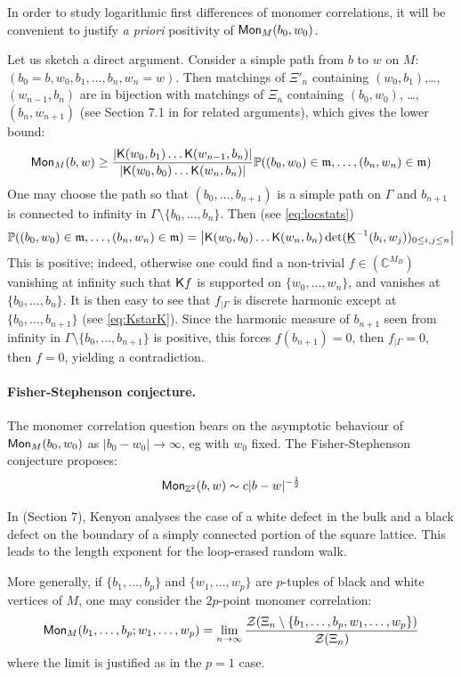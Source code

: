 \documentclass[10pt]{article}
\newcommand{\Z}{\mathbb{Z}}
\newcommand{\C}{\mathbb{C}}
\newcommand{\mc}{\mathcal}
\renewcommand{\P}{\mathbb{P}}
\newcommand{\rK}{{\sf K}}
\newcommand{\uK}{{\underline {\sf K}}}
\newcommand{\mfm}{{\mathfrak m}}
\newcommand{\Mon}{{\sf Mon}}
\begin{document}
In order to study logarithmic first differences of monomer correlations, it will be convenient to justify {\em a priori} positivity of $\Mon_M(b_0,w_0)$. 

Let us sketch a direct argument. Consider a simple path from $b$ to $w$ on $M$: $(b_0=b,w_0,b_1,\dots,b_n,w_{n}=w)$. Then matchings of $\Xi'_n$ containing $(w_0,b_1)$,\dots,$(w_{n-1},b_n)$ are in bijection with matchings of $\Xi_n$ containing $(b_0,w_0)$, \dots, $(b_n,w_{n+1})$ (see Section 7.1 in \cite{Ken_Lap} for related arguments), which gives the lower bound:
\begin{equation}\label{eq:monopos}
\Mon_M(b,w)\geq\frac{|\rK(w_0,b_1)\dots\rK(w_{n-1},b_n)|}{|\rK(w_0,b_0)\dots\rK(w_{n},b_n)|}\P((b_0,w_0)\in\mfm,\dots,(b_n,w_{n})\in\mfm)
\end{equation}
One may choose the path so that $(b_0,\dots,b_{n+1})$ is a simple path on $\Gamma$ and $b_{n+1}$ is connected to infinity in $\Gamma\setminus\{b_0,\dots,b_{n}\}$. Then (see \eqref{eq:locstats})
$$\P((b_0,w_0)\in\mfm,\dots,(b_n,w_{n})\in\mfm)=\left|\rK(w_0,b_0)\dots\rK(w_{n},b_n)\det(\uK^{-1}(b_{i},w_j))_{0\leq i,j\leq n}\right|$$
This is positive; indeed, otherwise one could find a non-trivial $f\in (\C^{M_B})$ vanishing at infinity such that $\rK f$ is supported on $\{w_0,\dots,w_n\}$, and vanishes at $\{b_0,\dots,b_n\}$. It is then easy to see that $f_{|\Gamma}$ is discrete harmonic except at $\{b_0,\dots,b_{n+1}\}$ (see \eqref{eq:KstarK}). Since the harmonic measure of $b_{n+1}$ seen from infinity in $\Gamma\setminus\{b_0,\dots,b_{n+1}\}$ is positive, this forces $f(b_{n+1})=0$, then $f_{|\Gamma}=0$, then $f=0$, yielding a contradiction.

\paragraph{Fisher-Stephenson conjecture.\\}

The monomer correlation question bears on the asymptotic behaviour of $\Mon_M(b_0,w_0)$ as $|b_0-w_0|\rightarrow\infty$, eg with $w_0$ fixed. The Fisher-Stephenson conjecture \cite{FisSte2} proposes:
$$\Mon_{\Z^2}(b,w)\sim c|b-w|^{-\frac 12}$$

In \cite{Ken_Lap} (Section 7), Kenyon analyses the case of a white defect in the bulk and a black defect on the boundary of a simply connected portion of the square lattice. This leads to the length exponent for the loop-erased random walk.

More generally, if $\{b_1,\dots,b_p\}$ and $\{w_1,\dots,w_p\}$ are $p$-tuples of black and white vertices of $M$, one may consider the $2p$-point monomer correlation:
$$\Mon_{M}(b_1,\dots,b_p;w_1,\dots,w_p)=\lim_{n\rightarrow\infty}\frac{{\mc Z}(\Xi_n\setminus\{b_1,\dots,b_p,w_1,\dots,w_p\})}{{\mc Z}(\Xi_n)}$$
where the limit is justified as in the $p=1$ case.
\end{document}
